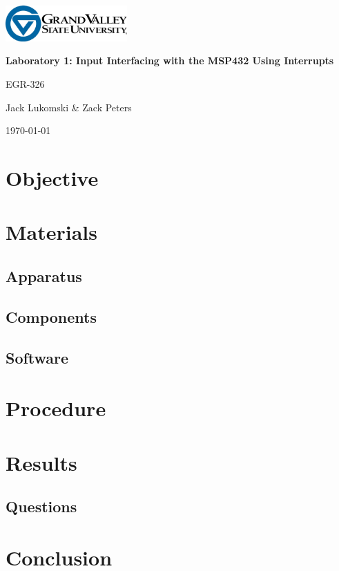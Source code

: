 \documentclass[11pt,a4paper]{article}
\newcommand{\titlestr}{Laboratory 1: Input Interfacing with the MSP432 Using Interrupts}
\newcommand{\authorstr}{Jack Lukomski \& Zack Peters}
\begin{document}
\begin{titlepage}
  \centering
  \includegraphics[width=0.35\textwidth]{images/GVSU.jpg}

  \vspace{1cm}
  {\LARGE \bf{\titlestr} \par}
  
  \vspace{.5cm}
  {\LARGE {EGR-326} \par}

  \vspace{1cm}
  {\Large \authorstr \par}

  \vspace{1cm}
  \today    

  \vfill
\end{titlepage}

\newpage

\tableofcontents
\newpage

\section{Objective}

\section{Materials}

\subsection{Apparatus}

\subsection{Components}

\subsection{Software}

\section{Procedure}

\section{Results}

\subsection{Questions}

\section{Conclusion}
\end{document}
